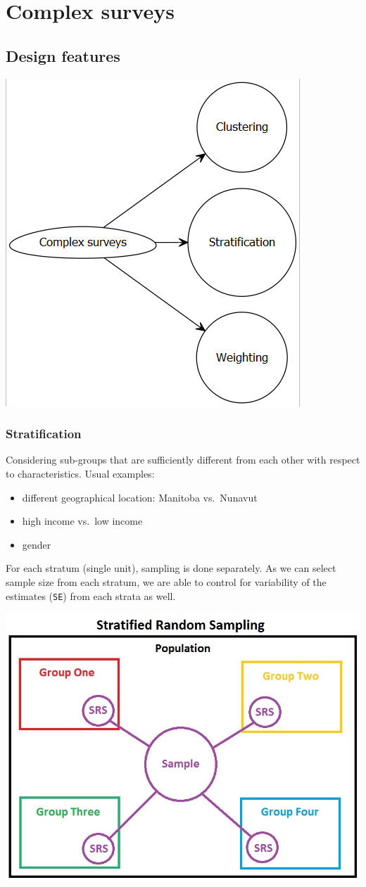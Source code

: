 \documentclass[
]{book}
\providecommand{\tightlist}{%
  \setlength{\itemsep}{0pt}\setlength{\parskip}{0pt}}
\begin{document}
\hypertarget{complex-surveys}{%
\section{Complex surveys}\label{complex-surveys}}

\hypertarget{design-features}{%
\subsection{Design features}\label{design-features}}

\includegraphics[width=0.45\linewidth]{images/design2}

\hypertarget{stratification}{%
\subsubsection{Stratification}\label{stratification}}

Considering sub-groups that are sufficiently different from each other with respect to characteristics. Usual examples:

\begin{itemize}
\tightlist
\item
  different geographical location: Manitoba vs.~Nunavut
\item
  high income vs.~low income
\item
  gender
\end{itemize}

For each stratum (single unit), sampling is done separately. As we can select sample size from each stratum, we are able to control for variability of the estimates (\texttt{SE}) from each strata as well.

\includegraphics[width=0.85\linewidth]{images/StratifiedRandomSampling}
\end{document}
